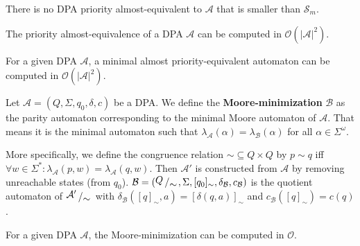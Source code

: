 \begin{lem}
	There is no DPA priority almost-equivalent to $\mathcal{A}$ that is smaller than $\mathcal{S}_m$.
\end{lem}

\begin{lem}
	The priority almost-equivalence of a DPA $\mathcal{A}$ can be computed in $\mathcal{O}(|\mathcal{A}|^2)$.
\end{lem}

\begin{theorem}
	For a given DPA $\mathcal{A}$, a minimal almost priority-equivalent automaton can be computed in $\mathcal{O}(|\mathcal{A}|^2)$. 
\end{theorem}
	


\begin{defn}
	Let $\mathcal{A} = (Q, \Sigma, q_0, \delta, c)$ be a DPA. We define the \textbf{Moore-minimization} $\mathcal{B}$ as the parity automaton corresponding to the minimal Moore automaton of $\mathcal{A}$. That means it is the minimal automaton such that $\lambda_\mathcal{A}(\alpha) = \lambda_\mathcal{B}(\alpha)$ for all $\alpha \in \Sigma^\omega$.
	
	More specifically, we define the congruence relation $\sim \subseteq Q \times Q$ by $p \sim q$ iff $\forall w \in \Sigma^*: \lambda_\mathcal{A}(p, w) = \lambda_\mathcal{A}(q, w)$. Then $\mathcal{A}'$ is constructed from $\mathcal{A}$ by removing unreachable states (from $q_0$). $\mathcal{B} = (\bigslant{Q}{\sim}, \Sigma, [q_0]_\sim, \delta_\mathcal{B}, c_\mathcal{B})$ is the quotient automaton of $\bigslant{\mathcal{A}'}{\sim}$ with $\delta_\mathcal{B}([q]_\sim, a) = [\delta(q, a)]_\sim$ and $c_\mathcal{B}([q]_\sim) = c(q)$.
\end{defn}

\begin{lem}
	For a given DPA $\mathcal{A}$, the Moore-minimization can be computed in $\mathcal{O}$.
\end{lem}






